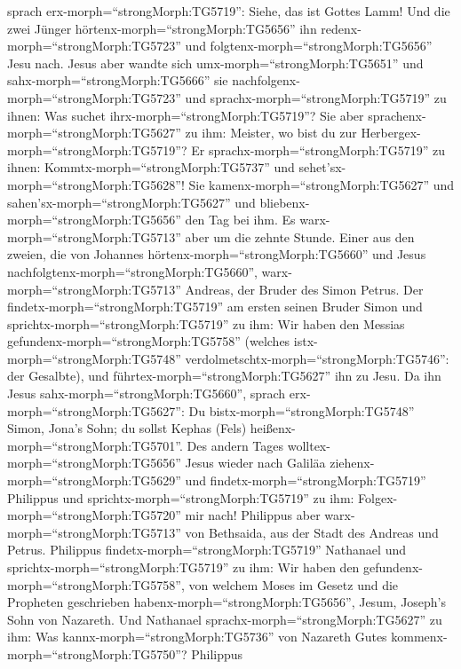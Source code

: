 sprach erx-morph=``strongMorph:TG5719'': Siehe, das ist Gottes Lamm!
 Und die zwei Jünger hörtenx-morph=``strongMorph:TG5656''
ihn redenx-morph=``strongMorph:TG5723'' und
folgtenx-morph=``strongMorph:TG5656'' Jesu nach.  Jesus
aber wandte sich umx-morph=``strongMorph:TG5651'' und
sahx-morph=``strongMorph:TG5666'' sie
nachfolgenx-morph=``strongMorph:TG5723'' und
sprachx-morph=``strongMorph:TG5719'' zu ihnen: Was suchet
ihrx-morph=``strongMorph:TG5719''? Sie aber
sprachenx-morph=``strongMorph:TG5627'' zu ihm: Meister, wo bist du zur
Herbergex-morph=``strongMorph:TG5719''?  Er
sprachx-morph=``strongMorph:TG5719'' zu ihnen:
Kommtx-morph=``strongMorph:TG5737'' und
sehet'sx-morph=``strongMorph:TG5628''! Sie
kamenx-morph=``strongMorph:TG5627'' und
sahen'sx-morph=``strongMorph:TG5627'' und
bliebenx-morph=``strongMorph:TG5656'' den Tag bei ihm. Es
warx-morph=``strongMorph:TG5713'' aber um die zehnte Stunde.
 Einer aus den zweien, die von Johannes
hörtenx-morph=``strongMorph:TG5660'' und Jesus
nachfolgtenx-morph=``strongMorph:TG5660'',
warx-morph=``strongMorph:TG5713'' Andreas, der Bruder des Simon Petrus.
 Der findetx-morph=``strongMorph:TG5719'' am ersten seinen
Bruder Simon und sprichtx-morph=``strongMorph:TG5719'' zu ihm: Wir haben
den Messias gefundenx-morph=``strongMorph:TG5758'' (welches
istx-morph=``strongMorph:TG5748''
verdolmetschtx-morph=``strongMorph:TG5746'': der Gesalbte),
 und führtex-morph=``strongMorph:TG5627'' ihn zu Jesu. Da
ihn Jesus sahx-morph=``strongMorph:TG5660'', sprach
erx-morph=``strongMorph:TG5627'': Du bistx-morph=``strongMorph:TG5748''
Simon, Jona's Sohn; du sollst Kephas (Fels)
heißenx-morph=``strongMorph:TG5701''.  Des andern Tages
wolltex-morph=``strongMorph:TG5656'' Jesus wieder nach Galiläa
ziehenx-morph=``strongMorph:TG5629'' und
findetx-morph=``strongMorph:TG5719'' Philippus und
sprichtx-morph=``strongMorph:TG5719'' zu ihm:
Folgex-morph=``strongMorph:TG5720'' mir nach!  Philippus
aber warx-morph=``strongMorph:TG5713'' von Bethsaida, aus der Stadt des
Andreas und Petrus.  Philippus
findetx-morph=``strongMorph:TG5719'' Nathanael und
sprichtx-morph=``strongMorph:TG5719'' zu ihm: Wir haben den
gefundenx-morph=``strongMorph:TG5758'', von welchem Moses im Gesetz und
die Propheten geschrieben habenx-morph=``strongMorph:TG5656'', Jesum,
Joseph's Sohn von Nazareth.  Und Nathanael
sprachx-morph=``strongMorph:TG5627'' zu ihm: Was
kannx-morph=``strongMorph:TG5736'' von Nazareth Gutes
kommenx-morph=``strongMorph:TG5750''? Philippus
